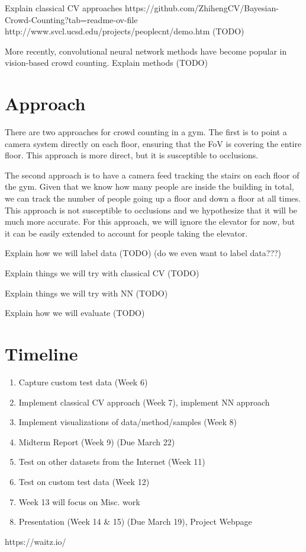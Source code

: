 \documentclass{article}
\begin{document}
Explain classical CV approaches https://github.com/ZhihengCV/Bayesian-Crowd-Counting?tab=readme-ov-file http://www.svcl.ucsd.edu/projects/peoplecnt/demo.htm (TODO)

More recently, convolutional neural network methods have become popular in vision-based crowd counting. Explain methods (TODO)

\section{Approach}
There are two approaches for crowd counting in a gym. The first is to point a camera system directly on each floor, ensuring that the FoV is covering the entire floor. This approach is more direct, but it is susceptible to occlusions.

The second approach is to have a camera feed tracking the stairs on each floor of the gym. Given that we know how many people are inside the building in total, we can track the number of people going up a floor and down a floor at all times. This approach is not susceptible to occlusions and we hypothesize that it will be much more accurate. For this approach, we will ignore the elevator for now, but it can be easily extended to account for people taking the elevator.

Explain how we will label data (TODO) (do we even want to label data???)

Explain things we will try with classical CV (TODO)

Explain things we will try with NN (TODO)

Explain how we will evaluate (TODO)


\section{Timeline}
\begin{enumerate} %
	\item Capture custom test data (Week 6)
	\item Implement classical CV approach (Week 7), implement NN approach
	\item Implement visualizations of data/method/samples (Week 8)
	\item Midterm Report (Week 9) (Due March 22)
	\item Test on other datasets from the Internet (Week 11)
	\item Test on custom test data (Week 12)
	\item Week 13 will focus on Misc. work
	\item Presentation (Week 14 \& 15) (Due March 19), Project Webpage
\end{enumerate}

\begin{thebibliography}{00}
	 https://waitz.io/
\end{thebibliography}
\end{document}

